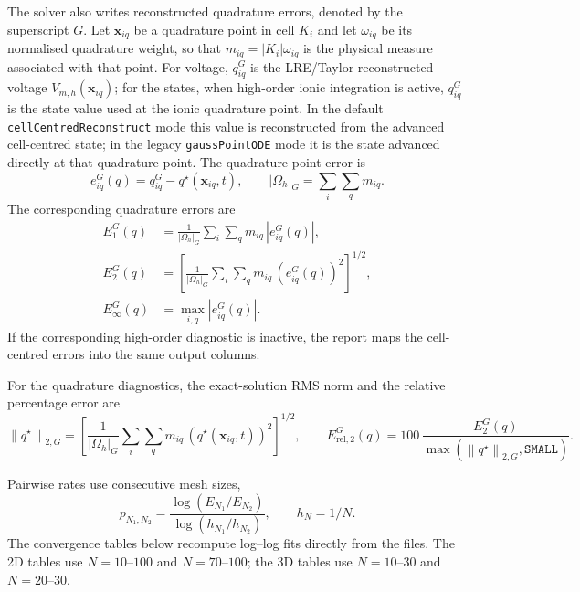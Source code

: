 \documentclass[11pt,a4paper]{article}
\newcommand{\code}[1]{\texttt{\small #1}}
\newcommand{\norm}[1]{\left\lVert #1 \right\rVert}
\begin{document}
The solver also writes reconstructed quadrature errors, denoted by the
superscript $G$. Let $\mathbf{x}_{iq}$ be a quadrature point in cell $K_i$ and
let $\omega_{iq}$ be its normalised quadrature weight, so that
$m_{iq}=|K_i|\omega_{iq}$ is the physical measure associated with that point.
For voltage, $q^G_{iq}$ is the LRE/Taylor reconstructed voltage
$V_{m,h}(\mathbf{x}_{iq})$; for the states, when high-order ionic integration is
active, $q^G_{iq}$ is the state value used at the ionic quadrature point. In
the default \code{cellCentredReconstruct} mode this value is reconstructed from
the advanced cell-centred state; in the legacy \code{gaussPointODE} mode it is
the state advanced directly at that quadrature point.
The quadrature-point error is
\begin{equation}
  e_{iq}^{G}(q)=q^G_{iq}-q^\star(\mathbf{x}_{iq},t),
  \qquad
  |\Omega_h|_G=\sum_i\sum_q m_{iq}.
\end{equation}
The corresponding quadrature errors are
\begin{align}
  E_{1}^{G}(q)
  &=
  \frac{1}{|\Omega_h|_G}
  \sum_i\sum_q m_{iq}\,|e_{iq}^{G}(q)|,
  \label{eq:gauss-l1-error}
  \\
  E_{2}^{G}(q)
  &=
  \left[
  \frac{1}{|\Omega_h|_G}
  \sum_i\sum_q m_{iq}\,\left(e_{iq}^{G}(q)\right)^2
  \right]^{1/2},
  \label{eq:gauss-l2-error}
  \\
  E_{\infty}^{G}(q)
  &=
  \max_{i,q} |e_{iq}^{G}(q)|.
  \label{eq:gauss-linf-error}
\end{align}
If the corresponding high-order diagnostic is inactive, the report maps the
cell-centred errors into the same output columns.

For the quadrature diagnostics, the exact-solution RMS norm and the relative
percentage error are
\begin{equation}
  \norm{q^\star}_{2,G}
  =
  \left[
  \frac{1}{|\Omega_h|_G}
  \sum_i\sum_q m_{iq}\,
  \left(q^\star(\mathbf{x}_{iq},t)\right)^2
  \right]^{1/2},
  \qquad
  E_{\mathrm{rel},2}^{G}(q)
  =
  100\,\frac{E_2^G(q)}{\max(\norm{q^\star}_{2,G},\texttt{SMALL})}.
\end{equation}

Pairwise rates use consecutive mesh sizes,
\begin{equation}
p_{N_1,N_2} = \frac{\log(E_{N_1}/E_{N_2})}{\log(h_{N_1}/h_{N_2})}, \qquad h_N=1/N.
\end{equation}
The convergence tables below recompute log--log fits directly from the
 files. The 2D tables use $N=10$--$100$ and
$N=70$--$100$; the 3D tables use $N=10$--$30$ and $N=20$--$30$.
\end{document}
